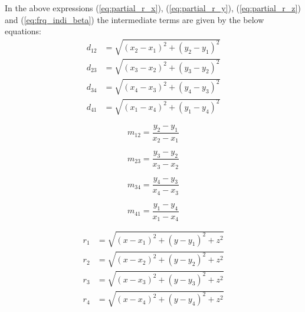 In the above expressions (\ref{eq:partial_r_x}), (\ref{eq:partial_r_y}), (\ref{eq:partial_r_z}) and (\ref{eq:frq_indi_beta}) the intermediate terms are given by the below equations:
\begin{align}
    d_{12} &= \sqrt{(x_2-x_1)^2+(y_2-y_1)^2}\\
    d_{23} &= \sqrt{(x_3-x_2)^2+(y_3-y_2)^2}\\
    d_{34} &= \sqrt{(x_4-x_3)^2+(y_4-y_3)^2}\\
    d_{41} &= \sqrt{(x_1-x_4)^2+(y_1-y_4)^2}
\end{align}

\noindent\begin{minipage}{.5\linewidth}
    \begin{equation}
        m_{12} =\frac{y_2-y_1}{x_2-x_1}
    \end{equation}
    \end{minipage}%
    \begin{minipage}{.5\linewidth}
    \begin{equation}
        m_{23} =\frac{y_3-y_2}{x_3-x_2}
    \end{equation}
\end{minipage}

\noindent\begin{minipage}{.5\linewidth}
    \begin{equation}
        m_{34} =\frac{y_4-y_3}{x_4-x_3}
    \end{equation}
    \end{minipage}%
    \begin{minipage}{.5\linewidth}
    \begin{equation}
        m_{41} =\frac{y_1-y_4}{x_1-x_4}
    \end{equation}
\end{minipage}


\begin{align}
    r_1 &= \sqrt{(x-x_1)^2+(y-y_1)^2+z^2}\\
    r_2 &= \sqrt{(x-x_2)^2+(y-y_2)^2+z^2}\\
    r_3 &= \sqrt{(x-x_3)^2+(y-y_3)^2+z^2}\\
    r_4 &= \sqrt{(x-x_4)^2+(y-y_4)^2+z^2}
\end{align}

